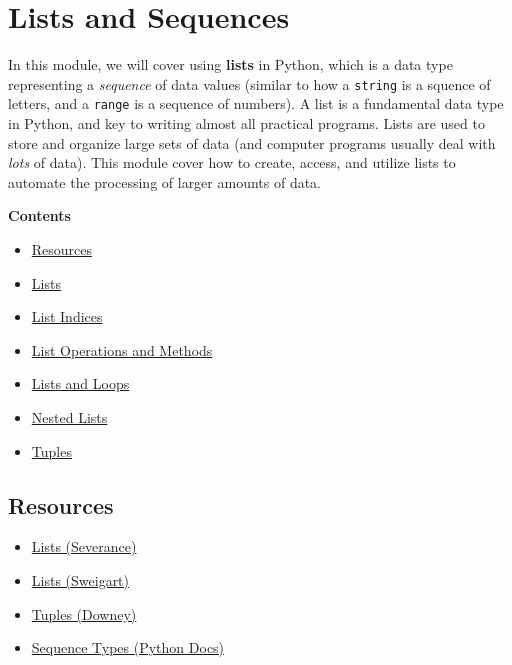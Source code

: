 \documentclass[]{book}
\providecommand{\tightlist}{%
  \setlength{\itemsep}{0pt}\setlength{\parskip}{0pt}}
\begin{document}
\chapter{Lists and Sequences}\label{lists-and-sequences}

In this module, we will cover using \textbf{lists} in Python, which is a
data type representing a \emph{sequence} of data values (similar to how
a \texttt{string} is a squence of letters, and a \texttt{range} is a
sequence of numbers). A list is a fundamental data type in Python, and
key to writing almost all practical programs. Lists are used to store
and organize large sets of data (and computer programs usually deal with
\emph{lots} of data). This module cover how to create, access, and
utilize lists to automate the processing of larger amounts of data.

\textbf{Contents}

\begin{itemize}
\tightlist
\item
  \protect\hyperlink{resources}{Resources}
\item
  \protect\hyperlink{lists}{Lists}
\item
  \protect\hyperlink{list-indices}{List Indices}
\item
  \protect\hyperlink{list-operations-and-methods}{List Operations and
  Methods}
\item
  \protect\hyperlink{lists-and-loops}{Lists and Loops}
\item
  \protect\hyperlink{nested-lists}{Nested Lists}
\item
  \protect\hyperlink{tuples}{Tuples}
\end{itemize}

\section{Resources}\label{resources-3}

\begin{itemize}
\tightlist
\item
  \href{http://openbookproject.net/thinkcs/python/english3e/lists.html}{Lists
  (Severance)}
\item
  \href{https://automatetheboringstuff.com/chapter4/}{Lists (Sweigart)}
\item
  \href{https://books.trinket.io/pfe/10-tuples.html}{Tuples (Downey)}
\item
  \href{https://docs.python.org/3/library/stdtypes.html\#sequence-types-list-tuple-range}{Sequence
  Types (Python Docs)}
\end{itemize}
\end{document}
